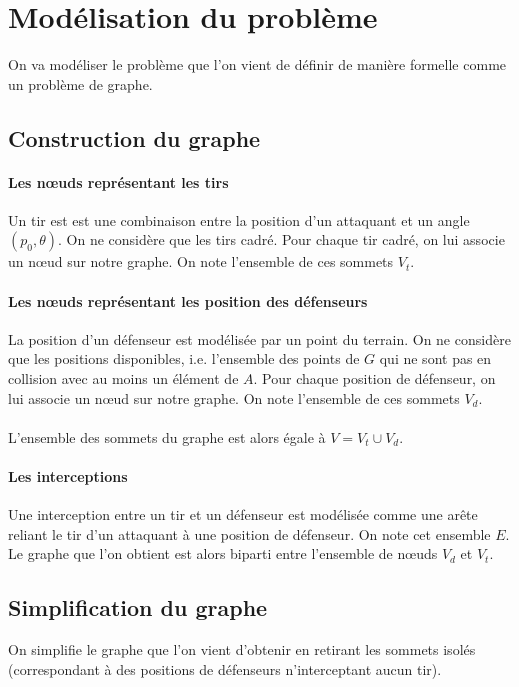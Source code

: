 \documentclass[12pt]{article}
\begin{document}
\section{Modélisation du problème}

On va modéliser le problème que l'on vient de définir de manière formelle comme un problème de graphe.

\subsection{Construction du graphe}

\paragraph{Les n\oe uds représentant les tirs}
Un tir est est une combinaison entre la position d'un attaquant et un angle $(p_0, \theta)$. On ne considère que les tirs cadré. Pour chaque tir cadré, on lui associe un n\oe ud sur notre graphe. On note l'ensemble de ces sommets $V_t$.

\paragraph{Les n\oe uds représentant les position des défenseurs}
La position d'un défenseur est modélisée par un point du terrain. On ne considère que les positions disponibles, i.e. l'ensemble des points de $G$ qui ne sont pas en collision avec au moins un élément de $A$. Pour chaque position de défenseur, on lui associe un n\oe ud sur notre graphe. On note l'ensemble de ces sommets $V_d$.

\paragraph{} L'ensemble des sommets du graphe est alors égale à $V = V_t \cup V_d$.

\paragraph{Les interceptions}
Une interception entre un tir et un défenseur est modélisée comme une arête reliant le tir d'un attaquant à une position de défenseur. On note cet ensemble $E$. Le graphe que l'on obtient est alors biparti entre l'ensemble de n\oe uds $V_d$ et $V_t$.

\subsection{Simplification du graphe}
On simplifie le graphe que l'on vient d'obtenir en retirant les sommets isolés (correspondant à des positions de défenseurs n'interceptant aucun tir).
\end{document}
